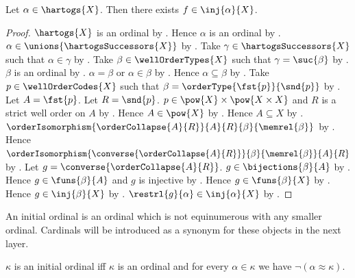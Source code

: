 \begin{theorem}\label{below_hartogs_injection}
    Let $\alpha\in\hartogs{X}$.
    Then there exists $f\in\inj{\alpha}{X}$.
\end{theorem}
\begin{proof}
    $\hartogs{X}$ is an ordinal by .
    Hence $\alpha$ is an ordinal by .
    $\alpha\in\unions{\hartogsSuccessors{X}}$ by .
    Take $\gamma\in\hartogsSuccessors{X}$ such that $\alpha\in\gamma$
        by .
    Take $\beta\in\wellOrderTypes{X}$ such that $\gamma=\suc{\beta}$
        by .
    $\beta$ is an ordinal by .
    $\alpha=\beta$ or $\alpha\in\beta$ by .
    Hence $\alpha\subseteq\beta$
        by .
    Take $p\in\wellOrderCodes{X}$ such that
        $\beta=\orderType{\fst{p}}{\snd{p}}$
        by .
    Let $A=\fst{p}$.
    Let $R=\snd{p}$.
    $p\in\pow{X}\times\pow{X\times X}$ and
        $R$ is a strict well order on $A$ by .
    Hence $A\in\pow{X}$ by .
    Hence $A\subseteq X$ by .
    $\orderIsomorphism{\orderCollapse{A}{R}}
        {A}{R}{\beta}{\memrel{\beta}}$
        by .
    Hence $\orderIsomorphism{\converse{\orderCollapse{A}{R}}}
        {\beta}{\memrel{\beta}}{A}{R}$
        by .
    Let $g=\converse{\orderCollapse{A}{R}}$.
    $g\in\bijections{\beta}{A}$ by .
    Hence $g\in\funs{\beta}{A}$ and $g$ is injective
        by .
    Hence $g\in\funs{\beta}{X}$ by .
    Hence $g\in\inj{\beta}{X}$
        by .
    $\restrl{g}{\alpha}\in\inj{\alpha}{X}$ by .
\end{proof}

An initial ordinal is an ordinal which is not equinumerous with any smaller
ordinal.  Cardinals will be introduced as a synonym for these objects in the
next layer.

\begin{definition}\label{initial_ordinal}
    $\kappa$ is an initial ordinal iff $\kappa$ is an ordinal and
        for every $\alpha\in\kappa$ we have
            $\lnot(\alpha\approx\kappa)$.
\end{definition}

